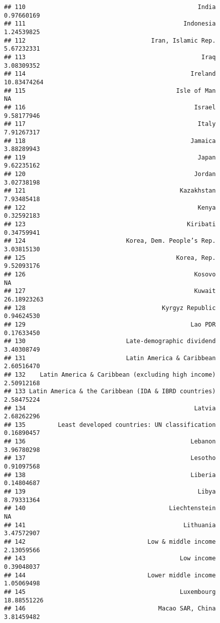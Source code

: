 \documentclass[]{article}
\begin{document}
\begin{verbatim}
## 110                                                India  0.97660169
## 111                                            Indonesia  1.24539825
## 112                                   Iran, Islamic Rep.  5.67232331
## 113                                                 Iraq  3.08309352
## 114                                              Ireland 10.83474264
## 115                                          Isle of Man          NA
## 116                                               Israel  9.58177946
## 117                                                Italy  7.91267317
## 118                                              Jamaica  3.88289943
## 119                                                Japan  9.62235162
## 120                                               Jordan  3.02738198
## 121                                           Kazakhstan  7.93485418
## 122                                                Kenya  0.32592183
## 123                                             Kiribati  0.34759941
## 124                            Korea, Dem. People’s Rep.  3.03815130
## 125                                          Korea, Rep.  9.52093176
## 126                                               Kosovo          NA
## 127                                               Kuwait 26.18923263
## 128                                      Kyrgyz Republic  0.94624530
## 129                                              Lao PDR  0.17633450
## 130                            Late-demographic dividend  3.40308749
## 131                            Latin America & Caribbean  2.60516470
## 132    Latin America & Caribbean (excluding high income)  2.50912168
## 133 Latin America & the Caribbean (IDA & IBRD countries)  2.58475224
## 134                                               Latvia  2.68262296
## 135         Least developed countries: UN classification  0.16890457
## 136                                              Lebanon  3.96780298
## 137                                              Lesotho  0.91097568
## 138                                              Liberia  0.14804687
## 139                                                Libya  8.79331364
## 140                                        Liechtenstein          NA
## 141                                            Lithuania  3.47572907
## 142                                  Low & middle income  2.13059566
## 143                                           Low income  0.39048037
## 144                                  Lower middle income  1.05069498
## 145                                           Luxembourg 18.88551226
## 146                                     Macao SAR, China  3.81459482

\end{verbatim}
\end{document}
